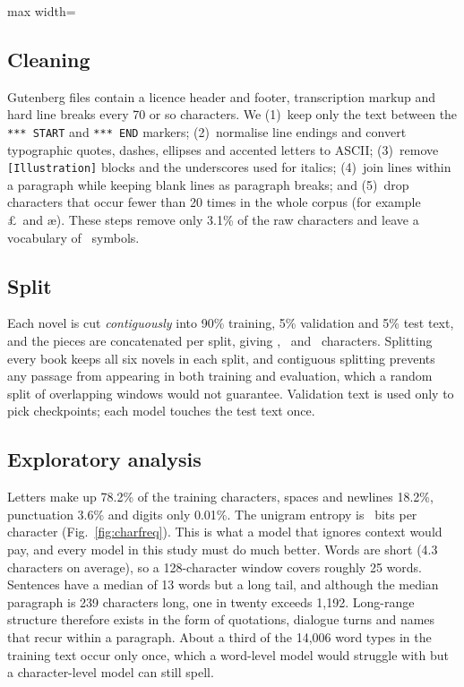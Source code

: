 \documentclass[journal,a4paper]{IEEEtran}
\newcommand{\fittable}[1]{\begin{adjustbox}{max width=\columnwidth}\end{adjustbox}}
\begin{document}
\begin{table}[!t]
\centering
\caption{Corpus statistics before and after cleaning.}
\label{tab:corpus}
\fittable{generated/tab_corpus.tex}
\end{table}

\subsection{Cleaning}
Gutenberg files contain a licence header and footer, transcription markup and hard line breaks every 70 or so characters. We (1)~keep only the text between the \texttt{*** START} and \texttt{*** END} markers; (2)~normalise line endings and convert typographic quotes, dashes, ellipses and accented letters to ASCII; (3)~remove \texttt{[Illustration]} blocks and the underscores used for italics; (4)~join lines within a paragraph while keeping blank lines as paragraph breaks; and (5)~drop characters that occur fewer than 20 times in the whole corpus (for example \pounds\ and \ae). These steps remove only 3.1\% of the raw characters and leave a vocabulary of \vocab~symbols.

\subsection{Split}
Each novel is cut \emph{contiguously} into 90\% training, 5\% validation and 5\% test text, and the pieces are concatenated per split, giving \trainchars, \valchars~and \testchars~characters. Splitting every book keeps all six novels in each split, and contiguous splitting prevents any passage from appearing in both training and evaluation, which a random split of overlapping windows would not guarantee. Validation text is used only to pick checkpoints; each model touches the test text once.

\subsection{Exploratory analysis}
Letters make up 78.2\% of the training characters, spaces and newlines 18.2\%, punctuation 3.6\% and digits only 0.01\%. The unigram entropy is \unigramH~bits per character (Fig.~\ref{fig:charfreq}). This is what a model that ignores context would pay, and every model in this study must do much better. Words are short (4.3 characters on average), so a 128-character window covers roughly 25 words. Sentences have a median of 13 words but a long tail, and although the median paragraph is 239 characters long, one in twenty exceeds 1{,}192. Long-range structure therefore exists in the form of quotations, dialogue turns and names that recur within a paragraph. About a third of the 14{,}006 word types in the training text occur only once, which a word-level model would struggle with but a character-level model can still spell.
\end{document}
